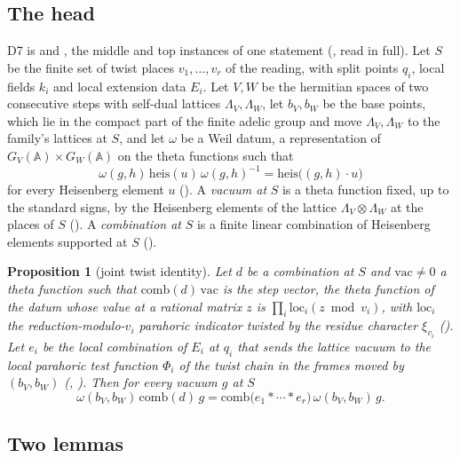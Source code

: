 \documentclass[11pt]{article}
\newtheorem{proposition}[theorem]{Proposition}
\theoremstyle{definition}
\theoremstyle{remark}
\begin{document}
\subsection{The head}
D7 is  and , the middle and top instances of one statement (, read in full). Let $S$ be the finite set of twist places $v_1,\dots,v_r$ of the reading, with split points $q_i$, local fields $k_i$ and local extension data $E_i$. Let $V,W$ be the hermitian spaces of two consecutive steps with self-dual lattices $\Lambda_V,\Lambda_W$, let $b_V,b_W$ be the base points, which lie in the compact part of the finite adelic group and move $\Lambda_V,\Lambda_W$ to the family's lattices at $S$, and let $\omega$ be a Weil datum, a representation of $G_V(\mathbb A)\times G_W(\mathbb A)$ on the theta functions such that
\begin{equation}\label{eq:weil}
\omega(g,h)\,\mathrm{heis}(u)\,\omega(g,h)^{-1}=\mathrm{heis}\big((g,h)\cdot u\big)
\end{equation}
for every Heisenberg element $u$ (). A \emph{vacuum at} $S$ is a theta function fixed, up to the standard signs, by the Heisenberg elements of the lattice $\Lambda_V\otimes\Lambda_W$ at the places of $S$ (). A \emph{combination at} $S$ is a finite linear combination of Heisenberg elements supported at $S$ ().

\begin{proposition}[joint twist identity]\label{prop:D7}
Let $d$ be a combination at $S$ and $\mathrm{vac}\ne0$ a theta function such that $\mathrm{comb}(d)\,\mathrm{vac}$ is the step vector, the theta function of the datum whose value at a rational matrix $z$ is $\prod_i\mathrm{loc}_{i}(z\bmod v_i)$, with $\mathrm{loc}_i$ the reduction-modulo-$v_i$ parahoric indicator twisted by the residue character $\xi_{v_i}$ (). Let $e_i$ be the local combination of $E_i$ at $q_i$ that sends the lattice vacuum to the local parahoric test function $\Phi_i$ of the twist chain in the frames moved by $(b_V,b_W)$ (, ). Then for every vacuum $g$ at $S$
\[
\omega(b_V,b_W)\,\mathrm{comb}(d)\,g=\mathrm{comb}\big(e_1*\cdots*e_r\big)\,\omega(b_V,b_W)\,g .
\]
\end{proposition}

\subsection{Two lemmas}
\end{document}
